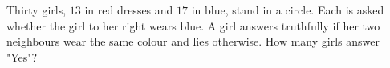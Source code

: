 Thirty girls, $13$ in red dresses and $17$ in blue, stand in a circle. Each is asked whether the girl to her right wears blue. A girl answers truthfully if her two neighbours wear the same colour and lies otherwise. How many girls answer "Yes"?
